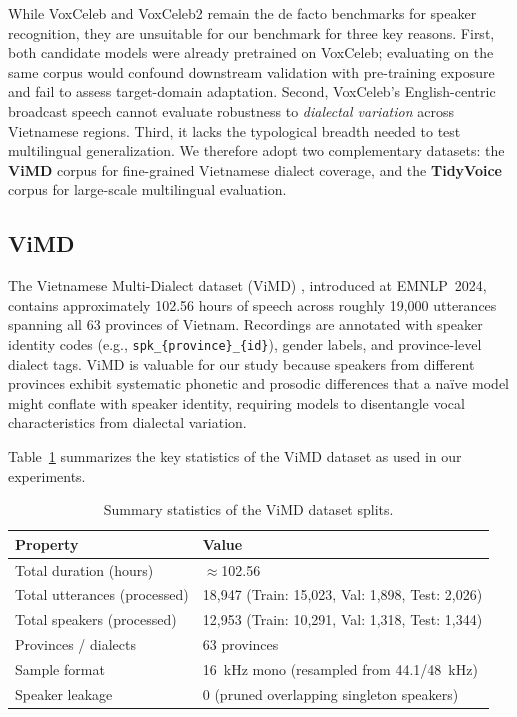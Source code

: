 While VoxCeleb \cite{nagrani2017voxceleb} and VoxCeleb2 \cite{chung2018voxceleb2} remain the de facto benchmarks for speaker recognition, they are unsuitable for our benchmark for three key reasons. First, both candidate models were already pretrained on VoxCeleb; evaluating on the same corpus would confound downstream validation with pre-training exposure and fail to assess target-domain adaptation. Second, VoxCeleb's English-centric broadcast speech cannot evaluate robustness to \emph{dialectal variation} across Vietnamese regions. Third, it lacks the typological breadth needed to test multilingual generalization. We therefore adopt two complementary datasets: the \textbf{ViMD} corpus \cite{dinh2024multidialect} for fine-grained Vietnamese dialect coverage, and the \textbf{TidyVoice} corpus \cite{farhadipour2026tidyvoice} for large-scale multilingual evaluation.

\subsection{ViMD}

The Vietnamese Multi-Dialect dataset (ViMD) \cite{dinh2024multidialect}, introduced at EMNLP~2024, contains approximately 102.56 hours of speech across roughly 19{,}000 utterances spanning all 63 provinces of Vietnam. Recordings are annotated with speaker identity codes (e.g., \texttt{spk\_\allowbreak\{province\}\_\allowbreak\{id\}}), gender labels, and province-level dialect tags. ViMD is valuable for our study because speakers from different provinces exhibit systematic phonetic and prosodic differences that a na\"ive model might conflate with speaker identity, requiring models to disentangle vocal characteristics from dialectal variation.

Table~\ref{tab:vimd-stats} summarizes the key statistics of the ViMD dataset as used in our experiments.

\begin{table}[H]
\centering
\begin{tabular}{ll}
\toprule
\textbf{Property} & \textbf{Value} \\
\midrule
Total duration (hours)       & $\approx$102.56 \\
Total utterances (processed) & 18{,}947 (Train: 15{,}023, Val: 1{,}898, Test: 2{,}026) \\
Total speakers (processed)   & 12{,}953 (Train: 10{,}291, Val: 1{,}318, Test: 1{,}344) \\
Provinces / dialects         & 63 provinces \\
Sample format                & 16~kHz mono (resampled from 44.1/48~kHz) \\
Speaker leakage              & 0 (pruned overlapping singleton speakers) \\
\bottomrule
\end{tabular}
\caption{Summary statistics of the ViMD dataset splits.}
\label{tab:vimd-stats}
\end{table}

